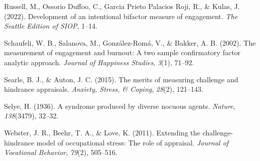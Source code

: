 \documentclass[
  man]{apa6}
\newlength{\cslhangindent}
\newlength{\cslentryspacingunit} %
\newenvironment{CSLReferences}[2] %
 {%
  \setlength{\parindent}{0pt}
  \ifodd #1
  \let\oldpar\par
  \def\par{\hangindent=\cslhangindent\oldpar}
  \fi
  \setlength{\parskip}{#2\cslentryspacingunit}
 }%
 {}
\begin{document}
\begin{CSLReferences}{1}{0}
\leavevmode{}%
Russell, M., Ossorio Duffoo, C., Garcia Prieto Palacios Roji, R., \& Kulas, J. (2022). Development of an intentional bifactor measure of engagement. \emph{The Seattle Edition of SIOP}, 1--14.

\leavevmode{}%
Schaufeli, W. B., Salanova, M., González-Romá, V., \& Bakker, A. B. (2002). The measurement of engagement and burnout: A two sample confirmatory factor analytic approach. \emph{Journal of Happiness Studies}, \emph{3}(1), 71--92.

\leavevmode{}%
Searle, B. J., \& Auton, J. C. (2015). The merits of measuring challenge and hindrance appraisals. \emph{Anxiety, Stress, \& Coping}, \emph{28}(2), 121--143.

\leavevmode{}%
Selye, H. (1936). A syndrome produced by diverse nocuous agents. \emph{Nature}, \emph{138}(3479), 32--32.

\leavevmode{}%
Webster, J. R., Beehr, T. A., \& Love, K. (2011). Extending the challenge-hindrance model of occupational stress: The role of appraisal. \emph{Journal of Vocational Behavior}, \emph{79}(2), 505--516.

\end{CSLReferences}

\endgroup
\end{document}
